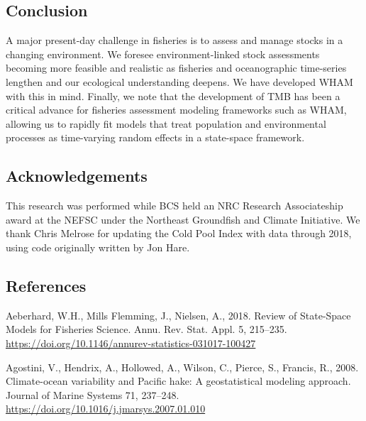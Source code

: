 \documentclass[]{article}
\begin{document}
\hypertarget{conclusion}{%
\subsection{Conclusion}\label{conclusion}}

A major present-day challenge in fisheries is to assess and manage
stocks in a changing environment. We foresee environment-linked stock
assessments becoming more feasible and realistic as fisheries and
oceanographic time-series lengthen and our ecological understanding
deepens. We have developed WHAM with this in mind. Finally, we note that
the development of TMB has been a critical advance for fisheries
assessment modeling frameworks such as WHAM, allowing us to rapidly fit
models that treat population and environmental processes as time-varying
random effects in a state-space framework.

\hypertarget{acknowledgements}{%
\subsection*{Acknowledgements}\label{acknowledgements}}

This research was performed while BCS held an NRC Research Associateship
award at the NEFSC under the Northeast Groundfish and Climate
Initiative. We thank Chris Melrose for updating the Cold Pool Index with
data through 2018, using code originally written by Jon Hare.

\pagebreak

\hypertarget{references}{%
\subsection*{References}\label{references}}

\hypertarget{refs}{}
\leavevmode\hypertarget{ref-aeberhard2018Review}{}%
Aeberhard, W.H., Mills Flemming, J., Nielsen, A., 2018. Review of
State-Space Models for Fisheries Science. Annu. Rev. Stat. Appl. 5,
215--235. \url{https://doi.org/10.1146/annurev-statistics-031017-100427}

\leavevmode\hypertarget{ref-agostini2008Climateocean}{}%
Agostini, V., Hendrix, A., Hollowed, A., Wilson, C., Pierce, S.,
Francis, R., 2008. Climate-ocean variability and Pacific hake: A
geostatistical modeling approach. Journal of Marine Systems 71,
237--248. \url{https://doi.org/10.1016/j.jmarsys.2007.01.010}
\end{document}
